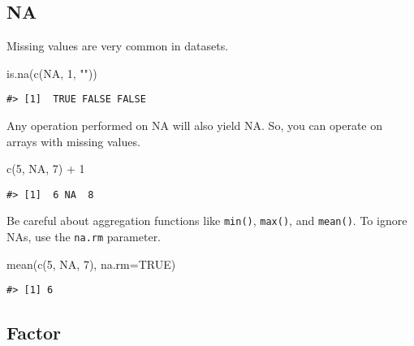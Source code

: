\documentclass[
]{book}
\newenvironment{Shaded}{\begin{snugshade}}{\end{snugshade}}
\newcommand{\AttributeTok}[1]{\textcolor[rgb]{0.77,0.63,0.00}{#1}}
\newcommand{\ConstantTok}[1]{\textcolor[rgb]{0.00,0.00,0.00}{#1}}
\newcommand{\DecValTok}[1]{\textcolor[rgb]{0.00,0.00,0.81}{#1}}
\newcommand{\FunctionTok}[1]{\textcolor[rgb]{0.00,0.00,0.00}{#1}}
\newcommand{\NormalTok}[1]{#1}
\newcommand{\SpecialCharTok}[1]{\textcolor[rgb]{0.00,0.00,0.00}{#1}}
\newcommand{\StringTok}[1]{\textcolor[rgb]{0.31,0.60,0.02}{#1}}
\begin{document}
\hypertarget{na}{%
\subsection{NA}\label{na}}

Missing values are very common in datasets.

\begin{Shaded}
\begin{Highlighting}[]
\FunctionTok{is.na}\NormalTok{(}\FunctionTok{c}\NormalTok{(}\ConstantTok{NA}\NormalTok{, }\DecValTok{1}\NormalTok{, }\StringTok{""}\NormalTok{))}
\end{Highlighting}
\end{Shaded}

\begin{verbatim}
#> [1]  TRUE FALSE FALSE
\end{verbatim}

Any operation performed on NA will also yield NA. So, you can operate on arrays with missing values.

\begin{Shaded}
\begin{Highlighting}[]
\FunctionTok{c}\NormalTok{(}\DecValTok{5}\NormalTok{, }\ConstantTok{NA}\NormalTok{, }\DecValTok{7}\NormalTok{) }\SpecialCharTok{+} \DecValTok{1}
\end{Highlighting}
\end{Shaded}

\begin{verbatim}
#> [1]  6 NA  8
\end{verbatim}

Be careful about aggregation functions like \texttt{min()}, \texttt{max()}, and \texttt{mean()}. To ignore NAs, use the \texttt{na.rm} parameter.

\begin{Shaded}
\begin{Highlighting}[]
\FunctionTok{mean}\NormalTok{(}\FunctionTok{c}\NormalTok{(}\DecValTok{5}\NormalTok{, }\ConstantTok{NA}\NormalTok{, }\DecValTok{7}\NormalTok{), }\AttributeTok{na.rm=}\ConstantTok{TRUE}\NormalTok{)}
\end{Highlighting}
\end{Shaded}

\begin{verbatim}
#> [1] 6
\end{verbatim}

\hypertarget{factor}{%
\subsection{Factor}\label{factor}}
\end{document}
